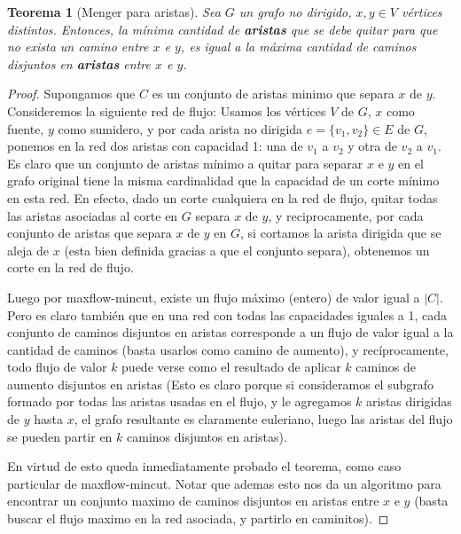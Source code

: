 \documentclass{article}
\newtheorem{teorema}{{\sc Teorema}}
\begin{document}
\begin{teorema}[Menger para aristas]
Sea $G$ un grafo no dirigido, $x,y \in V$ vértices distintos. Entonces, la mínima cantidad de \textbf{aristas} que se debe quitar para que no exista
un camino entre $x$ e $y$, es igual a la máxima cantidad de caminos disjuntos en \textbf{aristas} entre $x$ e $y$.
\end{teorema}
\begin{proof}
Supongamos que $C$ es un conjunto de aristas minimo que separa $x$ de $y$. Consideremos la siguiente red de flujo: Usamos los vértices $V$ de $G$, $x$ como fuente, $y$ como sumidero, y por cada arista no dirigida $e = \{ v_1,v_2 \} \in E$
de $G$, ponemos en la red dos aristas con capacidad 1: una de $v_1$ a $v_2$ y otra de $v_2$ a $v_1$. Es claro que un conjunto de aristas
mínimo a quitar para separar $x$ e $y$ en el grafo original tiene la misma cardinalidad que la capacidad de un corte mínimo en esta red.
En efecto, dado un corte cualquiera en la red de flujo, quitar todas las aristas asociadas al corte en $G$ separa $x$ de $y$,
y reciprocamente, por cada conjunto de aristas que separa $x$ de $y$ en $G$, si cortamos la arista dirigida que se aleja de $x$ (esta bien definida gracias
a que el conjunto separa), obtenemos un corte en la red de flujo.

Luego por maxflow-mincut, existe un flujo máximo (entero) de valor igual a $|C|$. Pero es claro también que en una red con todas las capacidades iguales a 1,
cada conjunto de caminos disjuntos en aristas corresponde a un flujo de valor igual a la cantidad de caminos (basta usarlos como camino de aumento),
y recíprocamente, todo flujo de valor $k$ puede verse como el resultado de aplicar $k$ caminos de aumento disjuntos en aristas
(Esto es claro porque si consideramos el subgrafo formado por todas las aristas usadas en el flujo, y le agregamos $k$ aristas dirigidas
de $y$ hasta $x$, el grafo resultante es claramente euleriano, luego las aristas del flujo se pueden partir en $k$ caminos disjuntos en
aristas).

En virtud de esto queda inmediatamente probado el teorema, como caso particular de maxflow-mincut. Notar que ademas esto nos da un algoritmo
para encontrar un conjunto maximo de caminos disjuntos en aristas entre $x$ e $y$ (basta buscar el flujo maximo en la red asociada, y partirlo
en caminitos).
\end{proof}
\end{document}
